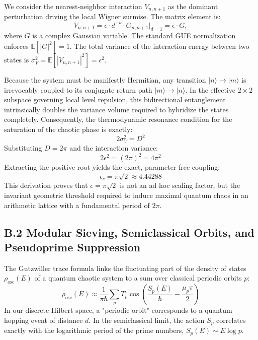 \documentclass[prl,aps,floatfix,superscriptaddress,10pt]{revtex4-2}
\begin{document}
We consider the nearest-neighbor interaction $V_{n, n+1}$ as the dominant perturbation driving the local Wigner surmise. The matrix element is:
\begin{equation}
V_{n, n+1} = \epsilon \cdot d^{-\nu} \cdot G_{n, n+1} \bigg|_{d=1} = \epsilon \cdot G,
\end{equation}
where $G$ is a complex Gaussian variable. The standard GUE normalization enforces $\mathbb{E}[|G|^2] = 1$. The total variance of the interaction energy between two states is $\sigma_V^2 = \mathbb{E}[|V_{n, n+1}|^2] = \epsilon^2$.

Because the system must be manifestly Hermitian, any transition $|n\rangle \to |m\rangle$ is irrevocably coupled to its conjugate return path $|m\rangle \to |n\rangle$. In the effective $2 \times 2$ subspace governing local level repulsion, this bidirectional entanglement intrinsically doubles the variance volume required to hybridize the states completely. Consequently, the thermodynamic resonance condition for the saturation of the chaotic phase is exactly:
\begin{equation}
2 \sigma_V^2 = D^2
\end{equation}
Substituting $D = 2\pi$ and the interaction variance:
\begin{equation}
2 \epsilon^2 = (2\pi)^2 = 4\pi^2
\end{equation}
Extracting the positive root yields the exact, parameter-free coupling:
\begin{equation}
\epsilon_c = \pi\sqrt{2} \approx 4.44288
\end{equation}
This derivation proves that $\epsilon = \pi\sqrt{2}$ is not an ad hoc scaling factor, but the invariant geometric threshold required to induce maximal quantum chaos in an arithmetic lattice with a fundamental period of $2\pi$.

\subsection{B.2 Modular Sieving, Semiclassical Orbits, and Pseudoprime Suppression}

The Gutzwiller trace formula links the fluctuating part of the density of states $\rho_{\text{osc}}(E)$ of a quantum chaotic system to a sum over classical periodic orbits $p$:
\begin{equation}
\rho_{\text{osc}}(E) \approx \frac{1}{\pi \hbar} \sum_p T_p \cos\left( \frac{S_p(E)}{\hbar} - \frac{\mu_p \pi}{2} \right)
\end{equation}
In our discrete Hilbert space, a "periodic orbit" corresponds to a quantum hopping event of distance $d$. In the semiclassical limit, the action $S_p$ correlates exactly with the logarithmic period of the prime numbers, $S_p(E) \sim E \log p$.
\end{document}
